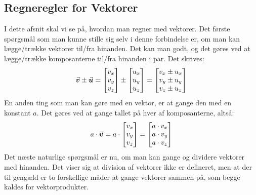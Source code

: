 \subsection{Regneregler for Vektorer}
I dette afsnit skal vi se på, hvordan man regner med vektorer. Det første spørgsmål som man kunne stille sig selv i denne forbindelse er, om man kan lægge/trække vektorer til/fra hinanden. Det kan man godt, og det gøres ved at lægge/trække komposanterne til/fra hinanden i par. Det skrives:
\begin{equation}
{\vec{\boldsymbol{v}}} \pm {\vec{\boldsymbol{u}}} = \begin{bmatrix} v_x \\ v_y \\ v_z \end{bmatrix} \pm \begin{bmatrix} u_x \\ u_y \\ u_z \end{bmatrix} = \begin{bmatrix} v_x \pm u_x \\ v_y \pm u_y \\ v_z \pm u_z \end{bmatrix}
\end{equation}
En anden ting som man kan gøre med en vektor, er at gange den med en konstant $a$. Det gøres ved at gange tallet på hver af komposanterne, altså:
\begin{equation}
a \cdot {\vec{\boldsymbol{v}}} = a \cdot \begin{bmatrix} v_x \\ v_y \\ v_z \end{bmatrix} = \begin{bmatrix} a \cdot v_x \\ a \cdot v_y \\ a \cdot v_z \end{bmatrix}
\end{equation}
Det næste naturlige spørgsmål er nu, om man kan gange og dividere vektorer med hinanden. Det viser sig at division af vektorer ikke er defineret, men at der til gengæld er to forskellige måder at gange vektorer sammen på, som begge kaldes for vektorprodukter.\\

